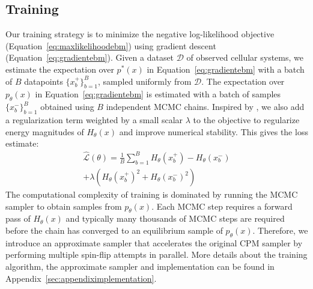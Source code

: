 \subsection{Training}
Our training strategy is to minimize the negative log-likelihood objective (Equation~\ref{eq:maxlikelihoodebm}) using gradient descent (Equation~\ref{eq:gradientebm}). 
Given a dataset $\mathcal{D}$ of observed cellular systems, we estimate the expectation over $p^*(x)$ in Equation~\ref{eq:gradientebm} with a batch of $B$ datapoints $\{x^+_b\}^B_{b=1}$, sampled uniformly from $\mathcal{D}$. The expectation over $p_\theta(x)$ in Equation~\ref{eq:gradientebm} is estimated with a batch of samples $\{x^-_b\}^B_{b=1}$ obtained using $B$ independent MCMC chains. Inspired by \cite{du2019implicit}, we also add a regularization term weighted by a small scalar $\lambda$ to the objective to regularize energy magnitudes of $H_\theta(x)$ and improve numerical stability. This gives the loss estimate:
\begin{multline}\label{eq:lossfn}
    \hat{\mathcal{L}}(\theta) = \frac{1}{B}\sum^B_{b=1} H_\theta(x^+_b) - H_\theta(x^-_b)\\ + \lambda \left(H_\theta(x^+_b)^2 +  H_\theta(x^-_b)^2\right) 
\end{multline}
The computational complexity of training is dominated by running the MCMC sampler to obtain samples from $p_\theta(x)$. Each MCMC step requires a forward pass of $H_\theta(x)$ and typically many thousands of MCMC steps are required before the chain has converged to an equilibrium sample of $p_\theta(x)$. Therefore, we introduce an approximate sampler that accelerates the original CPM sampler by performing multiple spin-flip attempts in parallel.
More details about the training algorithm, the approximate sampler and implementation can be found in Appendix~\ref{sec:appendiximplementation}.


